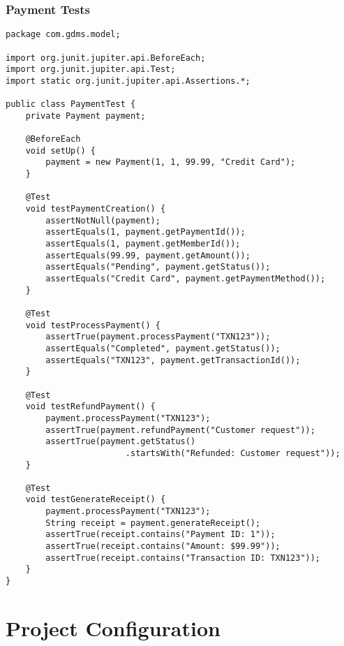 \documentclass[12pt,a4paper]{report}
\begin{document}
\subsection{Payment Tests}
\begin{lstlisting}[caption=PaymentTest.java]
package com.gdms.model;

import org.junit.jupiter.api.BeforeEach;
import org.junit.jupiter.api.Test;
import static org.junit.jupiter.api.Assertions.*;

public class PaymentTest {
    private Payment payment;

    @BeforeEach
    void setUp() {
        payment = new Payment(1, 1, 99.99, "Credit Card");
    }

    @Test
    void testPaymentCreation() {
        assertNotNull(payment);
        assertEquals(1, payment.getPaymentId());
        assertEquals(1, payment.getMemberId());
        assertEquals(99.99, payment.getAmount());
        assertEquals("Pending", payment.getStatus());
        assertEquals("Credit Card", payment.getPaymentMethod());
    }

    @Test
    void testProcessPayment() {
        assertTrue(payment.processPayment("TXN123"));
        assertEquals("Completed", payment.getStatus());
        assertEquals("TXN123", payment.getTransactionId());
    }

    @Test
    void testRefundPayment() {
        payment.processPayment("TXN123");
        assertTrue(payment.refundPayment("Customer request"));
        assertTrue(payment.getStatus()
                        .startsWith("Refunded: Customer request"));
    }

    @Test
    void testGenerateReceipt() {
        payment.processPayment("TXN123");
        String receipt = payment.generateReceipt();
        assertTrue(receipt.contains("Payment ID: 1"));
        assertTrue(receipt.contains("Amount: $99.99"));
        assertTrue(receipt.contains("Transaction ID: TXN123"));
    }
}
\end{lstlisting}

\chapter{Project Configuration}
\end{document}
